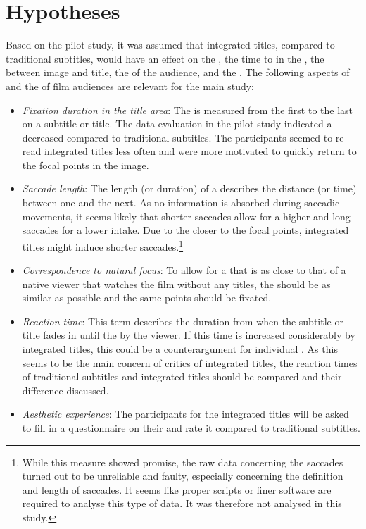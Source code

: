\largerpage[-1]
\section{Hypotheses}\label{sec:7.4}

Based on the pilot study, it was assumed that integrated titles, compared to traditional subtitles, would have an effect on the , the time to  in the , the  between image and title, the  of the audience, and the . The following aspects of  and the  of film audiences are relevant for the main study:


\begin{itemize}
\item \textit{Fixation duration in the title area}: The  is measured from the first to the last  on a subtitle or title. The data evaluation in the pilot study indicated a decreased  compared to traditional subtitles. The participants seemed to re-read integrated titles less often and were more motivated to quickly return to the focal points in the image.
\item \textit{Saccade length}: The length (or duration) of a  describes the distance (or time) between one  and the next. As no information is absorbed during saccadic movements, it seems likely that shorter saccades allow for a higher  and long saccades for a lower intake. Due to the  closer to the focal points, integrated titles might induce shorter saccades.\footnote{While this measure showed promise, the raw data concerning the saccades turned out to be unreliable and faulty, especially concerning the definition and length of saccades. It seems like proper scripts or finer software are required to analyse this type of data. It was therefore not analysed in this study.}
\item \textit{Correspondence to natural focus}: To allow for a  that is as close to that of a native viewer that watches the film without any titles, the  should be as similar as possible and the same  points should be fixated.
\item \textit{Reaction time}: This term describes the duration from when the subtitle or title fades in until the  by the viewer. If this time is increased considerably by integrated titles, this could be a counterargument for individual . As this seems to be the main concern of critics of integrated titles, the reaction times of traditional subtitles and integrated titles should be compared and their difference discussed.
\item \textit{Aesthetic experience}: The participants for the integrated titles will be asked to fill in a questionnaire on their  and rate it compared to traditional subtitles.
\end{itemize}

